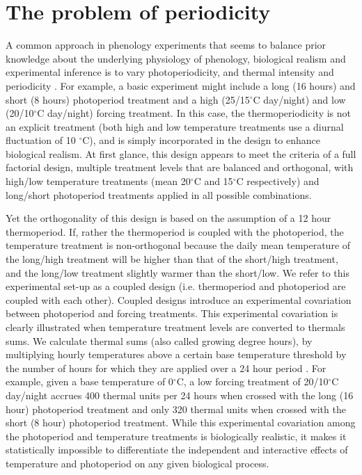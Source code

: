 \documentclass[11pt]{article}
\begin{document}
\section*{The problem of periodicity}
A common approach in phenology experiments that seems to balance prior knowledge about the underlying physiology of phenology, biological realism and experimental inference is to vary photoperiodicity, and thermal intensity and periodicity \citep[e.g.,][]{Flynn2018,Sanz-Perez:2009aa,Basler:2014aa}. For example, a basic experiment might include a long (16 hours) and short (8 hours) photoperiod treatment and a high (25/15$^{\circ}$C day/night) and low (20/10$^{\circ}$C day/night) forcing treatment. In this case, the thermoperiodicity is not an explicit treatment (both high and low temperature treatments use a diurnal fluctuation of 10 $^{\circ}$C), and is simply incorporated in the design to enhance biological realism. At first glance, this design appears to meet the criteria of a full factorial design, multiple treatment levels that are balanced and orthogonal, with high/low temperature treatments (mean 20$^{\circ}$C and 15$^{\circ}$C respectively) and long/short photoperiod treatments applied in all possible combinations.

Yet the orthogonality of this design is based on the assumption of a 12 hour thermoperiod. If, rather the thermoperiod is coupled with the photoperiod, the temperature treatment is non-orthogonal because the daily mean temperature of the long/high treatment will be higher than that of the short/high treatment, and the long/low treatment slightly warmer than the short/low. We refer to this experimental set-up as a coupled design (i.e. thermoperiod and photoperiod are coupled with each other).  %
Coupled designs introduce an experimental covariation between photoperiod and forcing treatments. This experimental covariation is clearly illustrated when temperature treatment levels are converted to thermals sums. We calculate thermal sums (also called growing degree hours), by multiplying hourly temperatures above a certain base temperature threshold by the number of hours for which they are applied over a 24 hour period \citep{Parent:2019ug}. For example, given a base temperature of 0$^{\circ}$C, a low forcing treatment of 20/10$^{\circ}$C day/night accrues 400 thermal units per 24 hours  when crossed with the long (16 hour) photoperiod treatment and only 320 thermal units when crossed with the short (8 hour) photoperiod treatment. While this experimental covariation among the photoperiod and temperature treatments is biologically realistic, it makes it statistically impossible to differentiate the independent and interactive effects of temperature and photoperiod on any given biological process.
\end{document}
